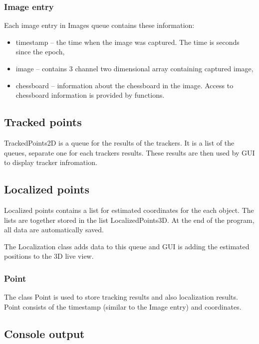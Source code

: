 \subsubsection*{Image entry}

Each image entry in Images queue contains these information:
\begin{itemize}
\item timestamp -- the time when the image was captured. The time is seconds since the epoch,
\item image -- contains 3 channel two dimensional array containing captured image,
\item chessboard -- information about the chessboard in the image. Access to
chessboard information is provided by functions.
\end{itemize}

\subsection*{Tracked points}

TrackedPoints2D is a queue for the results of the trackers. It is a list of the
queues, separate one for each trackers results. These results are then used by GUI to
display tracker infromation.

\subsection*{Localized points}

Localized points contains a list for estimated coordinates for the each object.
The lists are together stored in the list LocalizedPoints3D.  At the end of the
program, all data are automatically saved.

The Localization class adds data to this queue and GUI is adding the estimated
positions to the 3D live view.

\subsubsection*{Point}

The class Point is used to store tracking results and also localization
results.  Point consists of the timestamp (similar to the Image entry) and
coordinates.

\subsection*{Console output}

